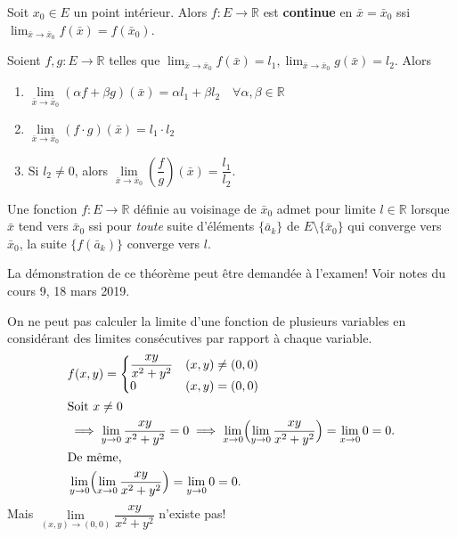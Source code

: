 \documentclass{report}
\begin{document}
\begin{defn}
	Soit $x_0 \in E$ un point intérieur. Alors $f : E \to \mathbb R$ est \textbf{continue} en $\bar x = \bar x_0$ ssi $\lim_{\bar x \to \bar x_0} f(\bar x) = f(\bar x_0)$.
\end{defn}

\begin{thm}
	Soient $f, g : E \to \mathbb R$ telles que $\lim_{\bar x \to \bar x_0} f(\bar x) = l_1, \lim_{\bar x \to \bar x_0} g(\bar x) = l_2$. Alors
	\begin{enumerate}
		\item $\lim\limits_{\bar x \to \bar x_0} (\alpha f + \beta g)(\bar x) = \alpha l_1 + \beta l_2 \quad \forall \alpha, \beta \in \mathbb R$
		\item $\lim\limits_{\bar x \to \bar x_0} (f \cdot g)(\bar x) = l_1 \cdot l_2$
		\item Si $l_2 \neq 0$, alors $\lim\limits_{\bar x \to \bar x_0} \left(\dfrac{f}{g}\right)(\bar x) = \dfrac{l_1}{l_2}$.
	\end{enumerate}
\end{thm}

\begin{thm}
	Une fonction $f : E \to \mathbb R$ définie au voisinage de $\bar x_0$ admet pour limite $l \in \mathbb R$ lorsque $\bar x$ tend vers $\bar x_0$ ssi pour \emph{toute} suite d'éléments $\{\bar a_k\}$ de $E \setminus \{\bar x_0\}$ qui converge vers $\bar x_0$, la suite $\{f(\bar a_k)\}$ converge vers $l$.
\end{thm}
\begin{attention} La démonstration de ce théorème peut être demandée à l'examen! Voir notes du cours 9, 18 mars 2019. \end{attention}

\begin{remark} On ne peut pas calculer la limite d'une fonction de plusieurs variables en considérant des limites consécutives par rapport à chaque variable.
\begin{align*}
	&f(x, y) = \begin{cases}\begin{aligned}
		&\frac{xy}{x^2 + y^2} & &(x, y) \neq (0, 0) \\
		&0 & &(x, y) = (0, 0)
		\end{aligned}\end{cases} \\
\intertext{Soit $x \neq 0$}
	&\implies \lim_{y \to 0} \frac{xy}{x^2 + y^2} = 0 \implies \lim_{x \to 0} \Bigl( \lim_{y \to 0} \frac{xy}{x^2 + y^2} \Bigr) = \lim_{x \to 0} 0 = 0. \\
\intertext{De même,}
	&\lim_{y \to 0} \Bigl( \lim_{x \to 0} \frac{xy}{x^2 + y^2} \Bigr) = \lim_{y \to 0} 0 = 0.
\end{align*}
	Mais $\lim\limits_{(x, y) \to (0, 0)} \dfrac{xy}{x^2 + y^2}$ n'existe pas!
\end{remark}
\end{document}
